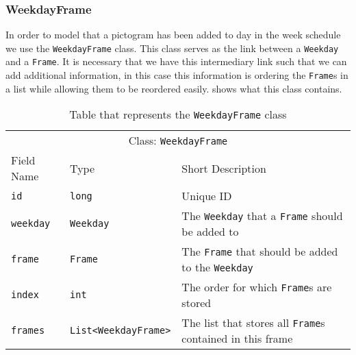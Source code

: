 \subsubsection{WeekdayFrame}
In order to model that a pictogram has been added to day in the week schedule we use the \texttt{WeekdayFrame} class.
This class serves as the link between a \texttt{Weekday} and a \texttt{Frame}.
It is necessary that we have this intermediary link such that we can add additional information, in this case this information is ordering the \texttt{Frame}s in a list while allowing them to be reordered easily.
 shows what this class contains.

\begin{table}[]
\centering
\caption{Table that represents the \texttt{WeekdayFrame} class}
\label{tbl:WeekdayFrame}
\begin{tabular}{lll}
\multicolumn{3}{c}{Class: \texttt{WeekdayFrame}}                                                                                                \\
Field Name          & Type                                            & Short Description                                                       \\
\texttt{id}         & \texttt{long}                                   & Unique ID                                                               \\
\texttt{weekday}    & \texttt{Weekday}                                & The \texttt{Weekday} that a \texttt{Frame} should be added to           \\
\texttt{frame}      & \texttt{Frame}                                  & The \texttt{Frame} that should be added to the \texttt{Weekday}         \\
\texttt{index}      & \texttt{int}                                    & The order for which \texttt{Frame}s are stored                          \\
\texttt{frames}     & \texttt{List\textless WeekdayFrame\textgreater} & The list that stores all \texttt{Frame}s contained in this frame
\end{tabular}
\end{table}

